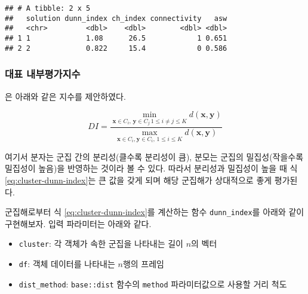 \documentclass[
]{book}
\providecommand{\tightlist}{%
  \setlength{\itemsep}{0pt}\setlength{\parskip}{0pt}}
\begin{document}
\begin{verbatim}
## # A tibble: 2 x 5
##   solution dunn_index ch_index connectivity   asw
##   <chr>         <dbl>    <dbl>        <dbl> <dbl>
## 1 1             1.08      26.5            1 0.651
## 2 2             0.822     15.4            0 0.586
\end{verbatim}

\hypertarget{cluster-evaluation-internal-index-explanation}{%
\subsubsection{대표 내부평가지수}\label{cluster-evaluation-internal-index-explanation}}

\citet{dunn1973fuzzy} 은 아래와 같은 지수를 제안하였다.

\begin{equation}
DI = \frac{\min_{\mathbf{x} \in C_i, \, \mathbf{y} \in C_j \, 1 \leq i \neq j \leq K} d(\mathbf{x}, \mathbf{y})}{\max_{\mathbf{x} \in C_i, \mathbf{y} \in C_i, \, 1 \leq i \leq K} d(\mathbf{x}, \mathbf{y})} \label{eq:cluster-dunn-index}
\end{equation}

여기서 분자는 군집 간의 분리성(클수록 분리성이 큼), 분모는 군집의 밀집성(작을수록 밀집성이 높음)을 반영하는 것이라 볼 수 있다. 따라서 분리성과 밀집성이 높을 때 식 \eqref{eq:cluster-dunn-index}는 큰 값을 갖게 되며 해당 군집해가 상대적으로 좋게 평가된다.

군집해로부터 식 \eqref{eq:cluster-dunn-index}를 계산하는 함수 \texttt{dunn\_index}를 아래와 같이 구현해보자. 입력 파라미터는 아래와 같다.

\begin{itemize}
\tightlist
\item
  \texttt{cluster}: 각 객체가 속한 군집을 나타내는 길이 \(n\)의 벡터
\item
  \texttt{df}: 객체 데이터를 나타내는 \(n\)행의 프레임
\item
  \texttt{dist\_method}: \texttt{base::dist} 함수의 \texttt{method} 파라미터값으로 사용할 거리 척도
\end{itemize}
\end{document}
